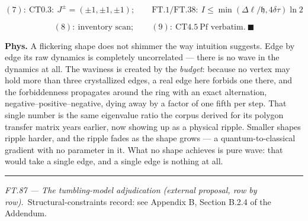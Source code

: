 \begin{theorem}
\[
(7):\ \mathrm{CT0.3}:\ J^\pm=(\pm1,\pm1,\pm1);\qquad\mathrm{FT.1}/\mathrm{FT.38}:\ I\le\min(\Delta\ell/\mathfrak h,4\delta\tau)\ln2
\]

\[
(8):\ \text{inventory scan};\qquad(9):\ \mathrm{CT4.5}\ \text{Pf verbatim}.\ \blacksquare
\]

\textbf{Phys.} A flickering shape does not shimmer the way intuition suggests. Edge by edge its raw dynamics is completely uncorrelated — there is no wave in the dynamics at all. The waviness is created by the \textit{budget}: because no vertex may hold more than three crystallized edges, a real edge here forbids one there, and the forbiddenness propagates around the ring with an exact alternation, negative–positive–negative, dying away by a factor of one fifth per step. That single number is the same eigenvalue ratio the corpus derived for its polygon transfer matrix years earlier, now showing up as a physical ripple. Smaller shapes ripple harder, and the ripple fades as the shape grows — a quantum-to-classical gradient with no parameter in it. What no shape achieves is pure wave: that would take a single edge, and a single edge is nothing at all.

\vspace{2pt}\noindent\rule{\textwidth}{0.4pt}\vspace{2pt}

\end{theorem}

\medskip\noindent\textit{\texorpdfstring{FT.87 — The tumbling-model adjudication (external proposal, row by row)}{FT.87 - The tumbling-model adjudication (external proposal, row by row)}.}\ Structural-constraints record: see Appendix B, Section B.2.4 of the Addendum.\par\medskip

